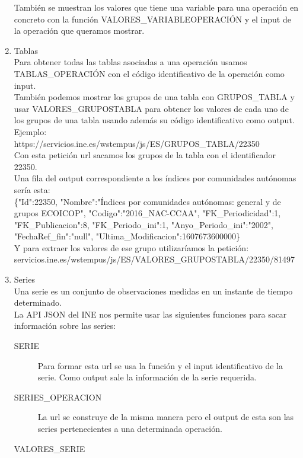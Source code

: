 \begin{enumerate}
    También se muestran los valores que tiene una variable para una operación en concreto con la función VALORES\_VARIABLEOPERACIÓN y el input de la operación que queramos mostrar. 
    \item Tablas\\
    Para obtener todas las tablas asociadas a una operación usamos TABLAS\_OPERACIÓN con el código identificativo de la operación como input.\\
    También podemos mostrar los grupos de una tabla con GRUPOS\_TABLA y usar VALORES\_GRUPOSTABLA para obtener los valores de cada uno de los grupos de una tabla usando además su código identificativo como output. Ejemplo:\\
    https://servicios.ine.es/wstempus/js/ES/GRUPOS\_TABLA/22350\\
    Con esta petición url sacamos los grupos de la tabla con el identificador 22350.\\
    Una fila del output correspondiente a los índices por comunidades autónomas sería esta:\\
    \{"Id":22350, "Nombre":"Índices por comunidades autónomas: general y de grupos ECOICOP", "Codigo":"2016\_NAC-CCAA", "FK\_Periodicidad":1, "FK\_Publicacion":8, "FK\_Periodo\_ini":1, "Anyo\_Periodo\_ini":"2002", "FechaRef\_fin":"null", "Ultima\_Modificacion":1607673600000\}\\
    Y para extraer los valores de ese grupo utilizaríamos la petición:\\
    \small servicios.ine.es/wstempus/js/ES/VALORES\_GRUPOSTABLA/22350/81497\\
    \item Series\\
    Una serie es un conjunto de observaciones medidas en un instante de tiempo determinado.\\ 
    La API JSON del INE nos permite usar las siguientes funciones para sacar información sobre las series:  
    \begin{description}
            \item [SERIE]
            Para formar esta url se usa la función y el input identificativo de la serie. Como output sale la información de la serie requerida.\\
            \item [SERIES\_OPERACION]
            La url se construye de la misma manera pero el output de esta son las series pertenecientes a una determinada operación.\\
            \item [VALORES\_SERIE]

\end{description}
\end{enumerate}

